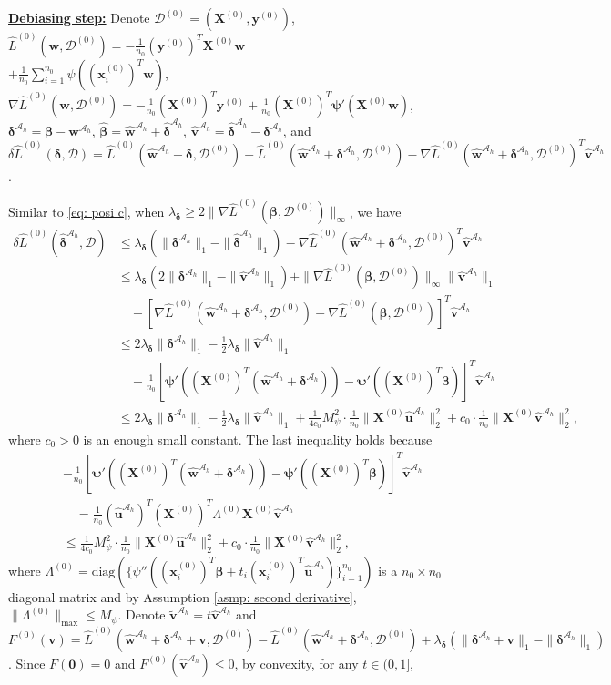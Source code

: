 \documentclass[12pt]{article}
\newcommand{\bdelta}{\bm{\delta}}
\newcommand{\bdeltaah}{\bm{\delta}^{\mathcal{A}_h}}
\newcommand{\hdeltaah}{\hat{\bm{\delta}}^{\mathcal{A}_h}}
\newcommand{\infnorm}[1]{\|#1\|_{\infty}}
\newcommand{\twonorm}[1]{\|#1\|_{2}}
\newcommand{\onenorm}[1]{\|#1\|_{1}}
\newcommand{\maxnorm}[1]{\|#1\|_{\max}}
\newcommand{\bbeta}{\bm{\beta}}
\newcommand{\hbeta}{\hat{\bm{\beta}}}
\newcommand{\bxk}[1]{\bm{x}^{(#1)}}
\newcommand{\byk}[1]{\bm{y}^{(#1)}}
\newcommand{\bXk}[1]{\bm{X}^{(#1)}}
\newcommand{\huah}{\hat{\bm{u}}^{\mathcal{A}_h}}
\newcommand{\bv}{\bm{v}}
\newcommand{\hvah}{\hat{\bm{v}}^{\mathcal{A}_h}}
\newcommand{\bw}{\bm{w}}
\newcommand{\bwah}{\bm{w}^{\mathcal{A}_h}}
\newcommand{\hwah}{\hat{\bm{w}}^{\mathcal{A}_h}}
\newcommand{\mah}{\mathcal{A}_h}
\newcommand{\md}{\mathcal{D}}
\newcommand{\bpsi}{\bm{\psi}}
\newcommand{\<}{\langle}
\renewcommand{\>}{\rangle}
\begin{document}
	\underline{\textbf{Debiasing step:}} 
Denote $\md^{(0)} = (\bXk{0}, \byk{0})$, $\hat{L}^{(0)}(\bw, \md^{(0)}) = -\frac{1}{n_0}(\byk{0})^T \bXk{0} \bw $\\ $+\frac{1}{n_0}\sum_{i=1}^{n_0}\psi((\bxk{0}_i)^T\bw)$, $\nabla \hat{L}^{(0)}(\bw, \md^{(0)}) 
	= -\frac{1}{n_0}(\bXk{0})^T \byk{0} + \frac{1}{n_0}(\bXk{0})^T\bpsi'(\bXk{0}\bw)$, $\bdeltaah = \bbeta - \bwah$, $\hbeta = \hwah + \hdeltaah$, $\hvah = \hdeltaah - \bdeltaah$, and $\delta \hat{L}^{(0)}(\bdelta, \md) = \hat{L}^{(0)}(\hwah + \bdelta, \md^{(0)}) - \hat{L}^{(0)}(\hwah + \bdeltaah, \md^{(0)}) - \nabla \hat{L}^{(0)}(\hwah + \bdeltaah, \md^{(0)})^T \hvah$. 
	
	Similar to \eqref{eq: posi c}, when $\lambda_{\bdelta} \geq 2\infnorm{\nabla \hat{L}^{(0)}(\bbeta, \md^{(0)})}$, we have
		\begin{align}
			\delta \hat{L}^{(0)}(\hdeltaah, \md) &\leq \lambda_{\bdelta}(\onenorm{\bdeltaah}-\onenorm{\hdeltaah}) - \nabla \hat{L}^{(0)}(\hwah + \bdeltaah, \md^{(0)})^T \hvah \\
			&\leq \lambda_{\bdelta}(2\onenorm{\bdeltaah} - \onenorm{\hvah}) + \infnorm{\nabla \hat{L}^{(0)}(\bbeta, \md^{(0)})}\onenorm{\hvah}\\
			&\quad - \left[\nabla \hat{L}^{(0)}(\hwah + \bdeltaah, \md^{(0)}) - \nabla \hat{L}^{(0)}(\bbeta, \md^{(0)})\right]^T\hvah\\
			&\leq 2\lambda_{\bdelta}\onenorm{\bdeltaah} - \frac{1}{2}\lambda_{\bdelta}\onenorm{\hvah} \\
			&\quad - \frac{1}{n_0}\left[\bpsi'((\bXk{0})^T(\hwah+\bdeltaah))-\bpsi'((\bXk{0})^T\bbeta)\right]^T\hvah\\
			&\leq 2\lambda_{\bdelta}\onenorm{\bdeltaah} - \frac{1}{2}\lambda_{\bdelta}\onenorm{\hvah} +\frac{1}{4c_0}M_{\psi}^2\cdot \frac{1}{n_0}\twonorm{\bXk{0}\huah}^2 + c_0 \cdot \frac{1}{n_0}\twonorm{\bXk{0}\hvah}^2, \label{eq: sec step right}
		\end{align}
		where $c_0 > 0$ is an enough small constant. The last inequality holds because
		\begin{align}
			&- \frac{1}{n_0}\left[\bpsi'((\bXk{0})^T(\hwah+\bdeltaah))-\bpsi'((\bXk{0})^T\bbeta)\right]^T\hvah \\
			&\quad = \frac{1}{n_0}(\huah)^T(\bXk{0})^T\Lambda^{(0)}\bXk{0}\hvah \\
			&\leq \frac{1}{4c_0}M_{\psi}^2\cdot \frac{1}{n_0}\twonorm{\bXk{0}\huah}^2 + c_0 \cdot \frac{1}{n_0}\twonorm{\bXk{0}\hvah}^2,
		\end{align}
		where $\Lambda^{(0)} = \text{diag}(\{\psi''((\bxk{0}_i)^T\bbeta + t_i(\bxk{0}_i)^T\huah)\}_{i=1}^{n_0})$ is a $n_0 \times n_0$ diagonal matrix and by Assumption \ref{asmp: second derivative}, $\maxnorm{\Lambda^{(0)}} \leq M_{\psi}$. Denote $\tilde{\bv}^{\mah} = t\hvah$ and $F^{(0)}(\bv) = \hat{L}^{(0)}(\hwah + \bdeltaah + \bv, \md^{(0)}) - \hat{L}^{(0)}(\hwah+\bdeltaah, \md^{(0)}) + \lambda_{\bdelta}(\onenorm{\bdeltaah + \bv} - \onenorm{\bdeltaah})$. Since $F(\bm{0}) = 0$ and $F^{(0)}(\hvah) \leq 0$, by convexity, for any $t \in (0, 1]$,
\end{document}
